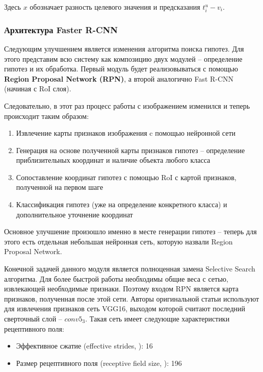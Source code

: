 Здесь $x$ обозначает разность целевого значения и предсказания $t_i^u - v_i$.

\subsubsection{Архитектура Faster R-CNN}

Следующим улучшением является изменения алгоритма поиска гипотез. Для этого представим всю систему как композицию двух модулей -- определение гипотез и их обработка. Первый модуль будет реализовываться с помощью \textbf{Region Proposal Network (RPN)}, а второй аналогично Fast R-CNN (начиная с RoI слоя).

Следовательно, в этот раз процесс работы с изображением изменился и теперь происходит таким образом:

\begin{enumerate}[1.]
	\item Извлечение карты признаков изображения c помощью нейронной сети
	\item Генерация на основе полученной карты признаков гипотез -- определение приблизительных координат и наличие объекта любого класса
	\item Сопоставление координат гипотез с помощью RoI с картой признаков, полученной на первом шаге
	\item Классификация гипотез (уже на определение конкретного класса) и дополнительное уточнение координат
\end{enumerate}

Основное улучшение произошло именно в месте генерации гипотез -- теперь для этого есть отдельная небольшая нейронная сеть, которую назвали Region Proposal Network.

Конечной задачей данного модуля является полноценная замена Selective Search алгоритма. Для более быстрой работы необходимы общие веса с сетью, извлекающей необходимые признаки. Поэтому входом RPN является карта признаков, полученная после этой сети. Авторы оригинальной статьи используют для извлечения признаков сеть VGG16, выходом которой считают последний сверточный слой -- $conv5_3$. Такая сеть имеет следующие характеристики рецептивного поля:

\begin{itemize}
    \item Эффективное сжатие (effective strides, ): 16
    \item  Размер рецептивного поля (receptive field size, ): 196
\end{itemize}

